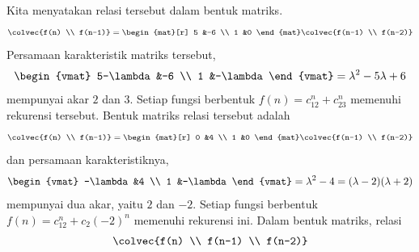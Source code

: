 \begin{exercises}
   \begin{answer}
    \begin{exparts}
      \partsitem 
        Kita menyatakan relasi tersebut dalam bentuk matriks.
        \begin{equation*}
          \colvec{f(n) \\ f(n-1)}
          =
          \begin{mat}[r]
            5  &-6  \\
            1  &0
          \end{mat}
          \colvec{f(n-1) \\ f(n-2)}
        \end{equation*}
        Persamaan karakteristik matriks tersebut,
        \begin{equation*}
          \begin{vmat}
            5-\lambda &-6       \\
            1         &-\lambda
          \end{vmat}
          =\lambda^2-5\lambda+6 
        \end{equation*}
        mempunyai akar $2$ dan $3$.
        Setiap fungsi berbentuk
        $f(n)=c_12^n+c_23^n$
        memenuhi rekurensi tersebut.
      \partsitem 
        Bentuk matriks relasi tersebut adalah
        \begin{equation*}
          \colvec{f(n) \\ f(n-1)}
          =
          \begin{mat}[r]
            0  &4  \\
            1  &0  
          \end{mat}
          \colvec{f(n-1) \\ f(n-2)}
        \end{equation*}
        dan persamaan karakteristiknya,
        \begin{equation*}
          \begin{vmat}
            -\lambda &4  \\
            1        &-\lambda
          \end{vmat}
          =\lambda^2-4=(\lambda-2)(\lambda+2)
        \end{equation*}
        mempunyai dua akar, yaitu $2$ dan $-2$.
        Setiap fungsi berbentuk
        $f(n)=c_12^n+c_2(-2)^n$
        memenuhi rekurensi ini.
      \partsitem 
        Dalam bentuk matriks, relasi
        \begin{equation*}
          \colvec{f(n) \\ f(n-1) \\ f(n-2)}

\end{equation*}
\end{exparts}
\end{answer}
\end{exercises}
